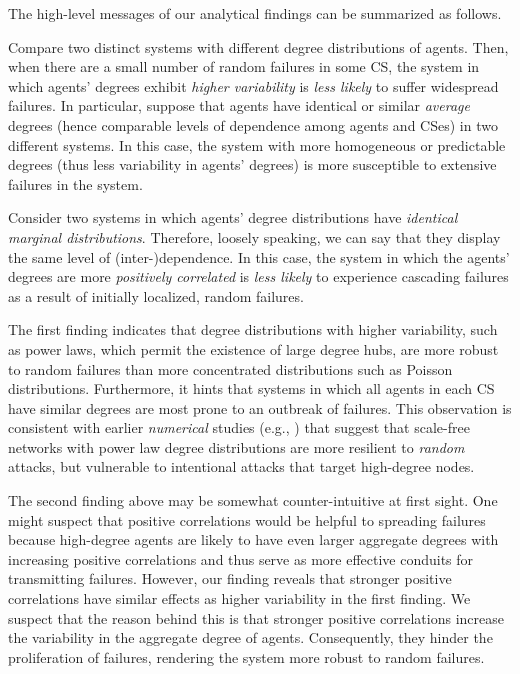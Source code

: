 \documentclass[10pt, journal, compsoc]{IEEEtran}
\newcommand{\myskip}{\\ \vspace{-0.1in}}
\begin{document}
The high-level messages of our analytical
findings can be summarized as follows.
\myskip

Compare two distinct systems with 
different degree distributions of agents. Then, 
when there are a small number of random failures 
in some CS, the system in which agents' degrees 
exhibit {\em higher variability} is {\em less 
likely} to suffer widespread failures.
In particular, 
suppose that agents have identical or similar 
{\em average} degrees (hence comparable levels of 
dependence among agents and CSes)
in two different systems. In this case, 
the system with more homogeneous or 
predictable degrees (thus 
less variability in agents' degrees) is more 
susceptible to extensive failures in the
system.
\myskip

 Consider two systems in 
which agents' degree distributions have {\em 
identical marginal distributions}. Therefore,
loosely speaking, we can say that they 
display the same level of (inter-)dependence. 
In this case, 
the system in which the agents' degrees are more
{\em positively correlated} is {\em less likely} 
to experience cascading failures as a result of 
initially localized, random failures. 
\myskip

The first finding indicates that degree 
distributions with higher variability, such as 
power laws, which permit the existence of large 
degree hubs, are more robust to random 
failures than more concentrated distributions 
such as Poisson distributions. 
Furthermore, it hints that systems in which 
all agents in each CS have similar degrees
are most prone to an outbreak of failures.
This observation is consistent with 
earlier {\em numerical} studies 
(e.g., \cite{Cohen1, Cohen2}) that suggest
that scale-free networks with power law
degree distributions are more resilient 
to {\em random} attacks, but vulnerable to
intentional attacks that target high-degree
nodes.  

The second finding above may be somewhat 
counter-intuitive at first sight. One might 
suspect that positive correlations 
would be helpful to spreading 
failures because high-degree agents are likely 
to have even larger aggregate 
degrees with increasing positive 
correlations and thus serve as more 
effective conduits for 
transmitting failures. However, our finding 
reveals that stronger positive correlations
have similar effects as higher variability
in the first finding. We suspect that the
reason behind this is that stronger 
positive correlations increase the 
variability in the aggregate degree of
agents. Consequently, they hinder the 
proliferation of failures, rendering the 
system more robust to random failures. 
\end{document}
